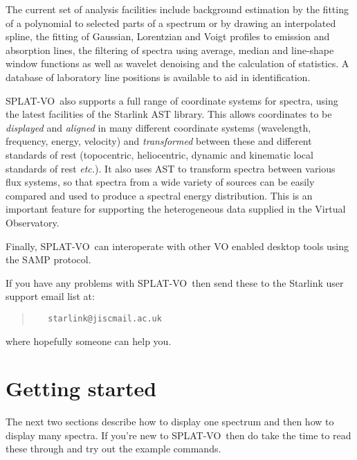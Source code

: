 \documentclass[twoside,11pt]{article}
\newcommand{\xref}[3]{#1}
\newcommand{\xlabel}[1]{}
\renewcommand{\_}{\texttt{\symbol{95}}}
\newcommand{\SPLAT}{\textsf{SPLAT-VO}}
\newcommand{\etc}{\textit{etc.}}
\begin{document}
The current set of analysis facilities include background estimation by the
fitting of a polynomial to selected parts of a spectrum or by drawing an
interpolated spline, the fitting of Gaussian, Lorentzian and Voigt profiles to
emission and absorption lines, the filtering of spectra using average,
median and line-shape window functions as well as wavelet denoising and
the calculation of statistics.
A database of laboratory line positions is available to aid in identification.

\SPLAT\ also supports a full range of coordinate systems for spectra,
using the latest facilities of the Starlink \xref{AST}{sun211}{}
library.
This allows coordinates to be \textit{displayed} and \textit{aligned}
in many different coordinate systems (wavelength, frequency, energy,
velocity) and \textit{transformed} between these and different
standards of rest (topocentric, heliocentric, dynamic and kinematic
local standards of rest \etc).
It also uses AST to transform spectra between various flux systems, so that
spectra from a wide variety of sources can be easily compared and used to
produce a spectral energy distribution.
This is an important feature for supporting the heterogeneous data supplied
in the Virtual Observatory.

Finally, \SPLAT\ can interoperate with other VO enabled desktop tools using
the SAMP protocol.


If you have any problems with \SPLAT\, then send these to the Starlink user
support email list at:
\begin{quote}
\begin{verbatim}
   starlink@jiscmail.ac.uk
\end{verbatim}
\end{quote}
where hopefully someone can help you.

\section{Getting started\xlabel{getting_started}}

The next two sections describe how to display one spectrum and then
how to display many spectra. If you're new to \SPLAT\ then do take the
time to read these through and try out the example commands.
\end{document}
